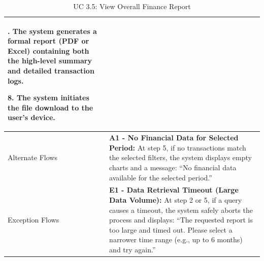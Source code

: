 \begin{table}[H]
\begin{tabularx}{\textwidth}{|>{\raggedright\arraybackslash}p{3.5cm}|>{\RaggedRight\arraybackslash}X|}
7. The system generates a formal report (PDF or Excel) containing both the high-level summary and detailed transaction logs. \par
8. The system initiates the file download to the user's device. \\
\hline
Alternate Flows & 
\textbf{A1 - No Financial Data for Selected Period:} At step 5, if no transactions match the selected filters, the system displays empty charts and a message: ``No financial data available for the selected period.'' \\
\hline
Exception Flows & 
\textbf{E1 - Data Retrieval Timeout (Large Data Volume):} At step 2 or 5, if a query causes a timeout, the system safely aborts the process and displays: ``The requested report is too large and timed out. Please select a narrower time range (e.g., up to 6 months) and try again.'' \\
\hline
\end{tabularx}
\caption{UC 3.5: View Overall Finance Report}
\label{tab:uc3.5}
\end{table}